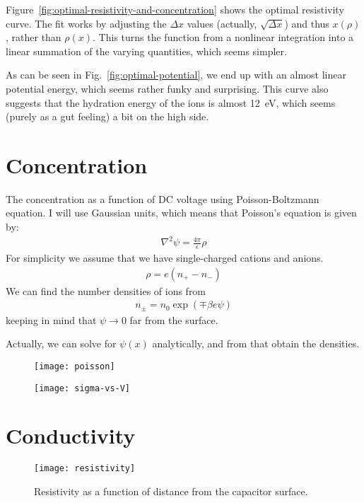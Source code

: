 \documentclass[twocolumn]{revtex4-1}
\begin{document}
Figure~\ref{fig:optimal-resistivity-and-concentration} shows the
optimal resistivity curve.  The fit works by adjusting the $\Delta x$
values (actually, $\sqrt{\Delta x}$) and thus $x(\rho)$, rather than
$\rho(x)$.  This turns the function from a nonlinear integration into
a linear summation of the varying quantities, which seems simpler.

As can be seen in Fig.~\ref{fig:optimal-potential}, we end up with an
almost linear potential energy, which seems rather funky and
surprising.  This curve also suggests that the hydration energy of the
ions is almost 12~eV, which seems (purely as a gut feeling) a bit on
the high side.

\clearpage

\appendix

\section{Concentration}

The concentration as a function of DC voltage using Poisson-Boltzmann
equation.  I will use Gaussian units, which means that Poisson's
equation is given by:
\begin{align}
  \nabla^2 \psi = \frac{4\pi}{\epsilon} \rho
\end{align}
For simplicity we assume that we have single-charged cations and
anions.
\begin{align}
  \rho = e (n_{+} - n_{-})
\end{align}
We can find the number densities of ions from
\begin{align}
  n_{\pm} = n_0 \exp(\mp\beta e \psi)
\end{align}
keeping in mind that $\psi\rightarrow 0$ far from the surface.

Actually, we can solve for $\psi(x)$ analytically, and from that
obtain the densities.

\begin{figure}
  \texttt{[image: poisson]}
\end{figure}

\begin{figure}
  \texttt{[image: sigma-vs-V]}
\end{figure}

\section{Conductivity}

\begin{figure}
  \texttt{[image: resistivity]}
  \caption{Resistivity as a function of distance from the capacitor
    surface.}
\end{figure}
\end{document}
